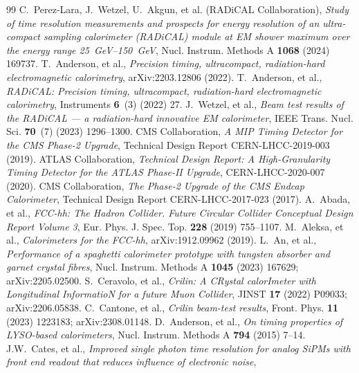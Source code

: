 \documentclass[final,5p,times,twocolumn]{elsarticle}
\begin{document}
\begin{thebibliography}{99}
 C.~Perez-Lara, J.~Wetzel, U.~Akgun, et al. (RADiCAL Collaboration),
\textit{Study of time resolution measurements and prospects for energy resolution of
an ultra-compact sampling calorimeter (RADiCAL) module at EM shower maximum over the
energy range 25~GeV--150~GeV}, Nucl. Instrum. Methods A \textbf{1068} (2024) 169737.
 T.~Anderson, et al., \textit{Precision timing, ultracompact,
radiation-hard electromagnetic calorimetry}, arXiv:2203.12806 (2022).
 T.~Anderson, et al., \textit{RADiCAL: Precision timing,
ultracompact, radiation-hard electromagnetic calorimetry}, Instruments \textbf{6}~(3)
(2022) 27.
 J.~Wetzel, et al., \textit{Beam test results of the RADiCAL --- a
radiation-hard innovative EM calorimeter}, IEEE Trans. Nucl. Sci. \textbf{70}~(7)
(2023) 1296--1300.
 CMS Collaboration, \textit{A MIP Timing Detector for the CMS Phase-2
Upgrade}, Technical Design Report CERN-LHCC-2019-003 (2019).
 ATLAS Collaboration, \textit{Technical Design Report: A High-Granularity
Timing Detector for the ATLAS Phase-II Upgrade}, CERN-LHCC-2020-007 (2020).
 CMS Collaboration, \textit{The Phase-2 Upgrade of the CMS Endcap
Calorimeter}, Technical Design Report CERN-LHCC-2017-023 (2017).
 A.~Abada, et al., \textit{FCC-hh: The Hadron Collider. Future Circular
Collider Conceptual Design Report Volume 3}, Eur. Phys. J. Spec. Top. \textbf{228}
(2019) 755--1107.
 M.~Aleksa, et al., \textit{Calorimeters for the FCC-hh},
arXiv:1912.09962 (2019).
 L.~An, et al., \textit{Performance of a spaghetti calorimeter prototype
with tungsten absorber and garnet crystal fibres}, Nucl. Instrum. Methods A \textbf{1045}
(2023) 167629; arXiv:2205.02500.
 S.~Ceravolo, et al., \textit{Crilin: A CRystal calorImeter with
Longitudinal InformatioN for a future Muon Collider}, JINST \textbf{17} (2022) P09033;
arXiv:2206.05838.
 C.~Cantone, et al., \textit{Crilin beam-test results}, Front. Phys.
\textbf{11} (2023) 1223183; arXiv:2308.01148.
 D.~Anderson, et al., \textit{On timing properties of LYSO-based
calorimeters}, Nucl. Instrum. Methods A \textbf{794} (2015) 7--14.
 J.W.~Cates, et al., \textit{Improved single photon time resolution
for analog SiPMs with front end readout that reduces influence of electronic noise},

\end{thebibliography}
\end{document}
